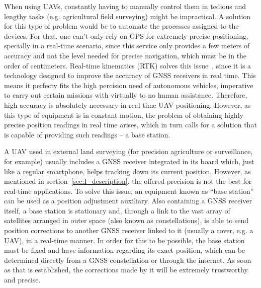 When using UAVs, constantly having to manually control them in tedious and lengthy tasks (e.g. agricultural field surveying) might be impractical.
A solution for this type of problem would be to automate the processes assigned to the devices. For that, one can't only rely on GPS for extremely precise positioning, specially in a real-time scenario, since this service only provides a few meters of accuracy and not the level needed for precise navigation, which must be in the order of centimeters. Real-time kinematics (RTK) solves this issue~\cite{gps_USGov,8714161},
since it is a technology designed to improve the accuracy of GNSS receivers in real time. This means it perfecty fits the high percision need of autonomous vehicles, imperative to carry out certain missions with virtually to no human assistance. Therefore, high accuracy is absolutely necessary in real-time UAV positioning.
However, as this type of equipment is in constant motion, the problem of obtaining highly precise position readings in real time arises, which in turn calls for a solution that is capable of providing such readings -- a base station.

A UAV used in external land surveying (for precision agriculture or surveillance, for example) usually includes a GNSS receiver integrated in its board which, just like a regular smartphone, helps tracking down its current position.
However, as mentioned in section~\ref{sec:I_description}, the offered precision is not the best for real-time applications.
To solve this issue, an equipment known as ``base station'' can be used as a position adjustment auxiliary.
Also containing a GNSS receiver itself, a base station is stationary and, through a link to the vast array of satellites arranged in outer space (also known as constellations), is able to send position corrections to another GNSS receiver linked to it (usually a rover, e.g. a UAV), in a real-time manner.
In order for this to be possible, the base station must be fixed and have information regarding its exact position, which can be determined directly from a GNSS constellation or through the internet.
As soon as that is established, the corrections made by it will be extremely trustworthy and precise.

